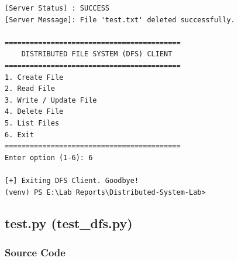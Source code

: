 \documentclass[main]{subfiles}
\begin{document}
\begin{verbatim}
[Server Status] : SUCCESS
[Server Message]: File 'test.txt' deleted successfully.

==========================================
    DISTRIBUTED FILE SYSTEM (DFS) CLIENT
==========================================
1. Create File
2. Read File
3. Write / Update File
4. Delete File
5. List Files
6. Exit
==========================================
Enter option (1-6): 6

[+] Exiting DFS Client. Goodbye!
(venv) PS E:\Lab Reports\Distributed-System-Lab> 
\end{verbatim}

\subsection*{test.py (test\_dfs.py)}

\subsubsection*{Source Code}
\end{document}
